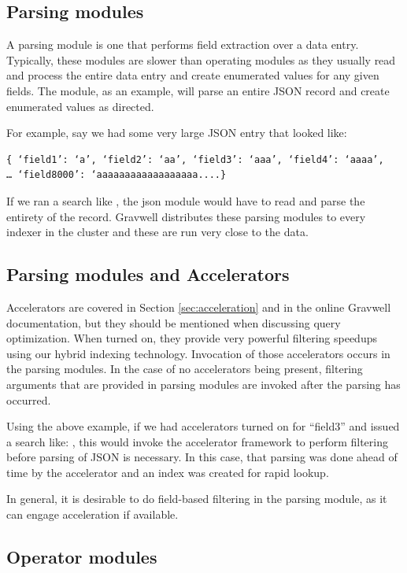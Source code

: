 \subsection{Parsing modules}
A parsing module is one that performs field extraction over a data
entry. Typically, these modules are slower than operating modules as
they usually read and process the entire data entry and create
enumerated values for any given fields. The  module, as an
example, will parse an entire JSON record and create enumerated values
as directed.

For example, say we had some very large JSON entry that looked like:

\begin{Verbatim}[breaklines=true]
{ ‘field1’: ‘a’, ‘field2’: ‘aa’, ‘field3’: ‘aaa’, ‘field4’: ‘aaaa’, 
… ‘field8000’: ‘aaaaaaaaaaaaaaaaaa....}
\end{Verbatim}

If we ran a search like , the json
module would have to read and parse the entirety of the record. Gravwell
distributes these parsing modules to every indexer in the cluster and
these are run very close to the data.

\subsection{Parsing modules and Accelerators}
Accelerators are covered in Section \ref{sec:acceleration} and in the online
Gravwell documentation, but they should be mentioned when discussing query optimization.
When turned on, they provide very powerful filtering speedups using our hybrid
indexing technology. Invocation of those accelerators occurs in the
parsing modules. In the case of no accelerators being present, filtering
arguments that are provided in parsing modules are invoked after the
parsing has occurred.

Using the above example, if we had accelerators turned on for ``field3''
and issued a search like: , this would invoke the
accelerator framework to perform filtering before parsing of JSON is
necessary. In this case, that parsing was done ahead of time by the
accelerator and an index was created for rapid lookup.

In general, it is desirable to do field-based filtering in the parsing
module, as it can engage acceleration if available.

\subsection{Operator modules}

